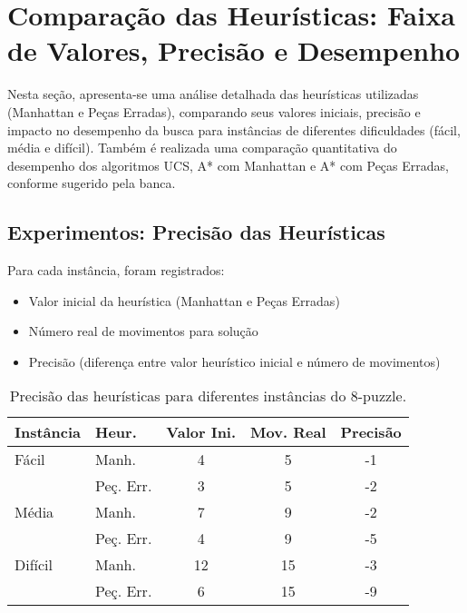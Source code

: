 \section{Comparação das Heurísticas: Faixa de Valores, Precisão e Desempenho}  
  
Nesta seção, apresenta-se uma análise detalhada das heurísticas utilizadas (Manhattan e Peças Erradas), comparando seus valores iniciais, precisão e impacto no desempenho da busca para instâncias de diferentes dificuldades (fácil, média e difícil). Também é realizada uma comparação quantitativa do desempenho dos algoritmos UCS, A* com Manhattan e A* com Peças Erradas, conforme sugerido pela banca.  
  
\subsection{Experimentos: Precisão das Heurísticas}  
  
Para cada instância, foram registrados:  
\begin{itemize}  
    \item Valor inicial da heurística (Manhattan e Peças Erradas)  
    \item Número real de movimentos para solução  
    \item Precisão (diferença entre valor heurístico inicial e número de movimentos)  
\end{itemize}  
  
\begin{table}[H]  
\centering  
\caption{Precisão das heurísticas para diferentes instâncias do 8-puzzle.}  
\begin{tabular}{l l c c c}  
\toprule  
Instância & Heur. & Valor Ini. & Mov. Real & Precisão \\  
\midrule  
Fácil     & Manh.      & 4 & 5  & -1 \\  
          & Peç. Err.  & 3 & 5  & -2 \\  
Média     & Manh.      & 7 & 9  & -2 \\  
          & Peç. Err.  & 4 & 9  & -5 \\  
Difícil   & Manh.      & 12 & 15 & -3 \\  
          & Peç. Err.  & 6  & 15 & -9 \\  
\bottomrule  
\end{tabular}  
\end{table}  
  
\vspace{0.5cm}  
  
